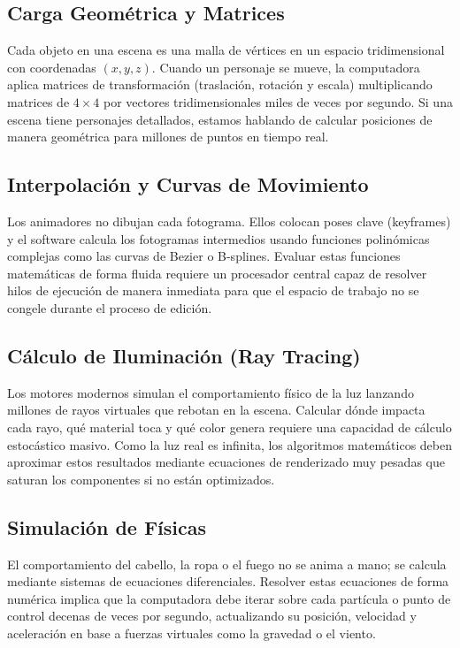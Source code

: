 \documentclass[14pt,a4paper]{extarticle}
\begin{document}
\subsection*{\centering Carga Geométrica y Matrices}
Cada objeto en una escena es una malla de vértices en un espacio tridimensional con coordenadas $(x, y, z)$. Cuando un personaje se mueve, la computadora aplica matrices de transformación (traslación, rotación y escala) multiplicando matrices de $4 \times 4$ por vectores tridimensionales miles de veces por segundo. Si una escena tiene personajes detallados, estamos hablando de calcular posiciones de manera geométrica para millones de puntos en tiempo real.

\subsection*{\centering Interpolación y Curvas de Movimiento}
Los animadores no dibujan cada fotograma. Ellos colocan poses clave (keyframes) y el software calcula los fotogramas intermedios usando funciones polinómicas complejas como las curvas de Bezier o B-splines. Evaluar estas funciones matemáticas de forma fluida requiere un procesador central capaz de resolver hilos de ejecución de manera inmediata para que el espacio de trabajo no se congele durante el proceso de edición.

\subsection*{\centering Cálculo de Iluminación (Ray Tracing)}
Los motores modernos simulan el comportamiento físico de la luz lanzando millones de rayos virtuales que rebotan en la escena. Calcular dónde impacta cada rayo, qué material toca y qué color genera requiere una capacidad de cálculo estocástico masivo. Como la luz real es infinita, los algoritmos matemáticos deben aproximar estos resultados mediante ecuaciones de renderizado muy pesadas que saturan los componentes si no están optimizados.

\subsection*{\centering Simulación de Físicas}
El comportamiento del cabello, la ropa o el fuego no se anima a mano; se calcula mediante sistemas de ecuaciones diferenciales. Resolver estas ecuaciones de forma numérica implica que la computadora debe iterar sobre cada partícula o punto de control decenas de veces por segundo, actualizando su posición, velocidad y aceleración en base a fuerzas virtuales como la gravedad o el viento.
\end{document}
